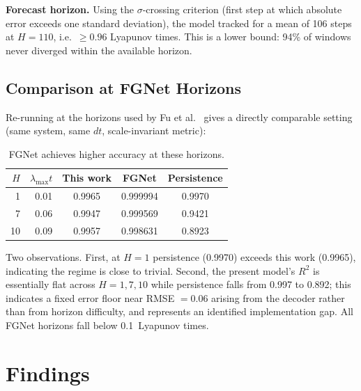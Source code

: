 \documentclass[11pt,a4paper]{article}
\begin{document}
\textbf{Forecast horizon.}
Using the $\sigma$-crossing criterion (first step at which absolute error exceeds one standard deviation), the model tracked for a mean of 106 steps at $H = 110$, i.e.\ $\geq 0.96$ Lyapunov times.
This is a lower bound: 94\% of windows never diverged within the available horizon.


\subsection{Comparison at FGNet Horizons}

Re-running at the horizons used by Fu et al.~\cite{fu2024} gives a directly comparable setting (same system, same $dt$, scale-invariant metric):

\begin{table}[H]
\centering
\caption{FGNet achieves higher accuracy at these horizons.}
\begin{tabular}{rr|cc|c}
\toprule
$H$ & $\lambda_{\max} t$ & This work & FGNet & Persistence \\
\midrule
1  & 0.01 & 0.9965 & 0.999994 & 0.9970 \\
7  & 0.06 & 0.9947 & 0.999569 & 0.9421 \\
10 & 0.09 & 0.9957 & 0.998631 & 0.8923 \\
\bottomrule
\end{tabular}
\end{table}

Two observations.
First, at $H = 1$ persistence (0.9970) exceeds this work (0.9965), indicating the regime is close to trivial.
Second, the present model's $R^2$ is essentially flat across $H = 1, 7, 10$ while persistence falls from 0.997 to 0.892; this indicates a fixed error floor near RMSE $= 0.06$ arising from the decoder rather than from horizon difficulty, and represents an identified implementation gap.
All FGNet horizons fall below 0.1~Lyapunov times.


\section{Findings}
\end{document}
